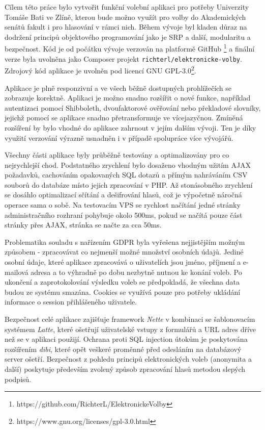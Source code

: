 Cílem této práce bylo vytvořit funkční volební aplikaci pro potřeby Univerzity Tomáše Bati ve Zlíně, kterou bude možno využít pro volby do Akademických senátů fakult i pro hlasování v rámci nich. Během vývoje byl kladen důraz na dodržení principů objektového programování jako je SRP a další, modularitu a bezpečnost. Kód je od počátku vývoje verzován na platformě GitHub \footnote{https://github.com/RichterL/ElektronickeVolby} a finální verze byla uvolněna jako Composer projekt \texttt{richterl/elektronicke-volby}. Zdrojový kód aplikace je uvolněn pod licencí GNU GPL-3.0\footnote{https://www.gnu.org/licenses/gpl-3.0.html}.

Aplikace je plně responzivní a ve všech běžně dostupných prohlížečích se zobrazuje korektně. Aplikaci je možno snadno rozšířit o nové funkce, například autentizaci pomocí Shibboleth, dvoufaktorové ověřování nebo překladové slovníky, jejichž pomocí se aplikace snadno přetransformuje ve vícejazyčnou. Zmíněná rozšíření by bylo vhodné do aplikace zahrnout v jejím dalším vývoji. Ten je díky využití verzování výrazně usnadněn i v případě spolupráce více vývojářů.

Všechny části aplikace byly průběžně testovány a optimalizovány pro co nejrychlejší chod. Podstatného zrychlení bylo dosaženo vhodným užitím AJAX požadavků, cachováním opakovaných SQL dotazů a přímým nahráváním CSV souborů do databáze místo jejich zpracování v PHP. Až stonásobného zrychlení se dosáhlo optimalizací sčítání a dešifrování hlasů, což je výpočetně náročná operace sama o sobě. Na testovacím VPS se rychlost načítání jedné stránky administračního rozhraní pohybuje okolo 500ms, pokud se načítá pouze část stránky přes AJAX, stránka se načte za cca 50ms.

Problematika souladu s nařízením GDPR byla vyřešena nejjistějším možným způsobem - zpracovávat co nejmenší možné množství osobních údajů. Jediné osobní údaje, které aplikace zpracovává o uživatelích jsou jméno, příjmení a e-mailová adresa a to výhradně po dobu nezbytně nutnou ke konání voleb. Po ukončení a zaprotokolování výsledku voleb se předpokladá, že všechna data budou ze systému smazána. Cookies se využívá pouze pro potřeby ukládání informace o session přihlášeného uživatele.

Bezpečnost celé aplikace zajišťuje framework \textit{Nette} v kombinaci se šablonovacím systémem \textit{Latte}, které ošetřují uživatelské vstupy z formulářů a URL adres dříve než se v aplikaci použijí. Ochrana proti SQL injection útokům je poskytována rozšířením \textit{dibi}, které opět veškeré proměnné před odesláním na databázový server ošetří. Bezpečnost z pohledu principů elektronických voleb (anonymita a další) poskytuje především zvolený způsob zpracování hlasů metodou slepých podpisů.
